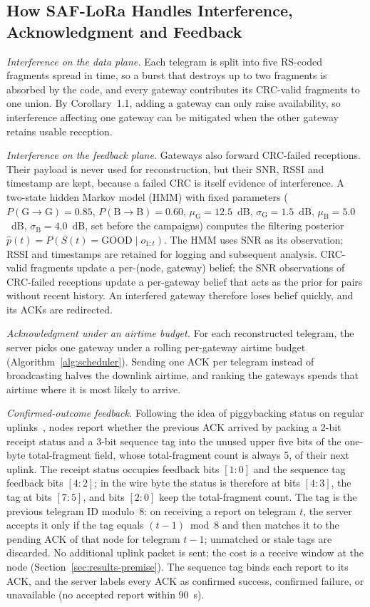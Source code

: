 \documentclass[journal]{IEEEtran}
\begin{document}
\subsection{How SAF-LoRa Handles Interference, Acknowledgment and Feedback}
\label{sec:loop}
\textit{Interference on the data plane.} Each telegram is split into five RS-coded fragments spread in time, so a burst that destroys up to two fragments is absorbed by the code, and every gateway contributes its CRC-valid fragments to one union. By Corollary~1.1, adding a gateway can only raise availability, so interference affecting one gateway can be mitigated when the other gateway retains usable reception.

\textit{Interference on the feedback plane.} Gateways also forward CRC-failed receptions. Their payload is never used for reconstruction, but their SNR, RSSI and timestamp are kept, because a failed CRC is itself evidence of interference. A two-state hidden Markov model (HMM) with fixed parameters ($P(\text{G}\!\to\!\text{G})=0.85$, $P(\text{B}\!\to\!\text{B})=0.60$, $\mu_{\text{G}}=12.5$~dB, $\sigma_{\text{G}}=1.5$~dB, $\mu_{\text{B}}=5.0$~dB, $\sigma_{\text{B}}=4.0$~dB, set before the campaigns) computes the filtering posterior $\hat p(t)=P(S(t)=\text{GOOD}\mid o_{1:t})$. The HMM uses SNR as its observation; RSSI and timestamps are retained for logging and subsequent analysis. CRC-valid fragments update a per-(node, gateway) belief; the SNR observations of CRC-failed receptions update a per-gateway belief that acts as the prior for pairs without recent history. An interfered gateway therefore loses belief quickly, and its ACKs are redirected.

\textit{Acknowledgment under an airtime budget.} For each reconstructed telegram, the server picks one gateway under a rolling per-gateway airtime budget (Algorithm~\ref{alg:scheduler}). Sending one ACK per telegram instead of broadcasting halves the downlink airtime, and ranking the gateways spends that airtime where it is most likely to arrive.

\textit{Confirmed-outcome feedback.} Following the idea of piggybacking status on regular uplinks~\cite{todoli2021}, nodes report whether the previous ACK arrived by packing a 2-bit receipt status and a 3-bit sequence tag into the unused upper five bits of the one-byte total-fragment field, whose total-fragment count is always 5, of their next uplink. The receipt status occupies feedback bits $[1{:}0]$ and the sequence tag feedback bits $[4{:}2]$; in the wire byte the status is therefore at bits $[4{:}3]$, the tag at bits $[7{:}5]$, and bits $[2{:}0]$ keep the total-fragment count. The tag is the previous telegram ID modulo~8: on receiving a report on telegram $t$, the server accepts it only if the tag equals $(t-1)\bmod 8$ and then matches it to the pending ACK of that node for telegram $t-1$; unmatched or stale tags are discarded. No additional uplink packet is sent; the cost is a receive window at the node (Section~\ref{sec:results-premise}). The sequence tag binds each report to its ACK, and the server labels every ACK as confirmed success, confirmed failure, or unavailable (no accepted report within 90~s).
\end{document}
